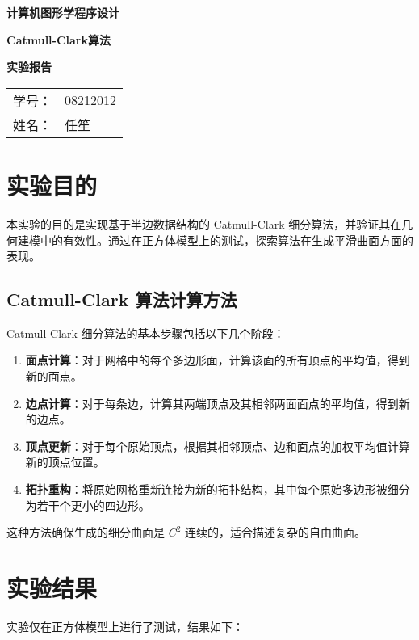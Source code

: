 \documentclass[a4paper,12pt]{article}
\begin{document}
\begin{titlepage}
    \centering
    \vspace*{3cm} %

    {\Huge \textbf{计算机图形学程序设计}\par}
    {\Huge \textbf{Catmull-Clark算法}\par}
    \vspace{0.5cm}
    {\Huge \textbf{实验报告}\par}

    \vspace{8cm} %

    {\Large
    \begin{tabular}{rl}
        学号： & 08212012 \\
        姓名： & 任笙
    \end{tabular}
    \par}

    \vfill %
\end{titlepage}

\section{实验目的}
本实验的目的是实现基于半边数据结构的 Catmull-Clark 细分算法，并验证其在几何建模中的有效性。通过在正方体模型上的测试，探索算法在生成平滑曲面方面的表现。

\subsection*{Catmull-Clark 算法计算方法}
Catmull-Clark 细分算法的基本步骤包括以下几个阶段：
\begin{enumerate}
    \item \textbf{面点计算}：对于网格中的每个多边形面，计算该面的所有顶点的平均值，得到新的面点。
    \item \textbf{边点计算}：对于每条边，计算其两端顶点及其相邻两面面点的平均值，得到新的边点。
    \item \textbf{顶点更新}：对于每个原始顶点，根据其相邻顶点、边和面点的加权平均值计算新的顶点位置。
    \item \textbf{拓扑重构}：将原始网格重新连接为新的拓扑结构，其中每个原始多边形被细分为若干个更小的四边形。
\end{enumerate}
这种方法确保生成的细分曲面是 $C^2$ 连续的，适合描述复杂的自由曲面。

\section{实验结果}
实验仅在正方体模型上进行了测试，结果如下：
\end{document}
